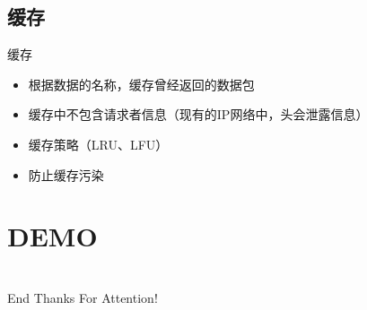 \documentclass[mathserif]{beamer}
\begin{document}
\subsection{缓存}
\begin{frame}{缓存}
  \begin{itemize}
    \item 根据数据的名称，缓存曾经返回的数据包
    \item 缓存中不包含请求者信息（现有的IP网络中，头会泄露信息）
    \item 缓存策略（LRU、LFU）
    \item 防止缓存污染
  \end{itemize}
\end{frame}

\section{DEMO}
\begin{frame}
\end{frame}
\AtBeginSection{}

\section[End]{}
\begin{frame}{End}
  \color{blue}\huge{Thanks For Attention!}
\end{frame}
\end{document}
